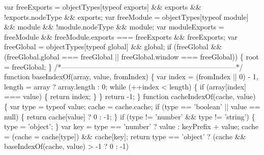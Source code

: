 \begin{DoxyCodeInclude}
\textcolor{stringliteral}{}
\textcolor{stringliteral}{  var freeExports = objectTypes[typeof exports] && exports && !exports.nodeType && exports;}
\textcolor{stringliteral}{}
\textcolor{stringliteral}{  var freeModule = objectTypes[typeof module] && module && !module.nodeType && module;}
\textcolor{stringliteral}{}
\textcolor{stringliteral}{  var moduleExports = freeModule && freeModule.exports === freeExports && freeExports;}
\textcolor{stringliteral}{}
\textcolor{stringliteral}{  var freeGlobal = objectTypes[typeof global] && global;}
\textcolor{stringliteral}{  if (freeGlobal && (freeGlobal.global === freeGlobal || freeGlobal.window === freeGlobal)) \{}
\textcolor{stringliteral}{    root = freeGlobal;}
\textcolor{stringliteral}{  \}}
\textcolor{stringliteral}{}
\textcolor{stringliteral}{  /*--------------------------------------------------------------------------*/}
\textcolor{stringliteral}{}
\textcolor{stringliteral}{  function baseIndexOf(array, value, fromIndex) \{}
\textcolor{stringliteral}{    var index = (fromIndex || 0) - 1,}
\textcolor{stringliteral}{        length = array ? array.length : 0;}
\textcolor{stringliteral}{}
\textcolor{stringliteral}{    while (++index < length) \{}
\textcolor{stringliteral}{      if (array[index] === value) \{}
\textcolor{stringliteral}{        return index;}
\textcolor{stringliteral}{      \}}
\textcolor{stringliteral}{    \}}
\textcolor{stringliteral}{    return -1;}
\textcolor{stringliteral}{  \}}
\textcolor{stringliteral}{}
\textcolor{stringliteral}{  function cacheIndexOf(cache, value) \{}
\textcolor{stringliteral}{    var type = typeof value;}
\textcolor{stringliteral}{    cache = cache.cache;}
\textcolor{stringliteral}{}
\textcolor{stringliteral}{    if (type == '}\textcolor{keywordtype}{boolean}\textcolor{stringliteral}{' || value == null) \{}
\textcolor{stringliteral}{      return cache[value] ? 0 : -1;}
\textcolor{stringliteral}{    \}}
\textcolor{stringliteral}{    if (type != '}number\textcolor{stringliteral}{' && type != '}\textcolor{keywordtype}{string}\textcolor{stringliteral}{') \{}
\textcolor{stringliteral}{      type = '}\textcolor{keywordtype}{object}\textcolor{stringliteral}{';}
\textcolor{stringliteral}{    \}}
\textcolor{stringliteral}{    var key = type == '}number\textcolor{stringliteral}{' ? value : keyPrefix + value;}
\textcolor{stringliteral}{    cache = (cache = cache[type]) && cache[key];}
\textcolor{stringliteral}{}
\textcolor{stringliteral}{    return type == '}\textcolor{keywordtype}{object}\textcolor{stringliteral}{'}
\textcolor{stringliteral}{      ? (cache && baseIndexOf(cache, value) > -1 ? 0 : -1)}

\end{DoxyCodeInclude}
